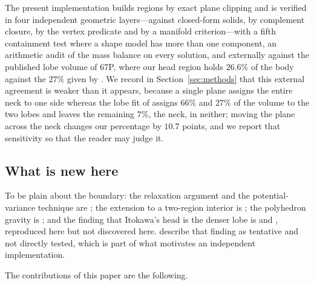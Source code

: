 The present implementation builds regions by exact plane clipping and is
verified in four independent geometric layers---against closed-form solids,
by complement closure, by the vertex predicate and by a manifold
criterion---with a fifth containment test where a shape model has more than
one component, an arithmetic audit of the mass balance on every solution,
and externally against the published lobe volume of 67P, where our head region holds $26.6\%$ of
the body against the $27\%$ given by \citet{jorda2016}. We record in
Section~\ref{sec:methods} that this external agreement is weaker than it
appears, because a single plane assigns the entire neck to one side
whereas the lobe fit of \citet{jorda2016} assigns $66\%$ and $27\%$ of
the volume to the two lobes and leaves the remaining $7\%$, the neck, in
neither; moving the plane across the neck changes our percentage by
$10.7$ points, and we report that sensitivity so that the reader may
judge it.

\subsection{What is new here}
\label{sec:intro:new}

To be plain about the boundary: the relaxation argument and the
potential-variance technique are \citet{richardson2014}; the extension
to a two-region interior is \citet{kanamaru2019}; the polyhedron gravity
is \citet{werner1996}; and the finding that Itokawa's head is the denser
lobe is \citet{lowry2014} and \citet{kanamaru2019}, reproduced here but
not discovered here. \citet{scheeres2020} describe that finding as
tentative and not directly tested, which is part of what motivates an
independent implementation.

The contributions of this paper are the following.

